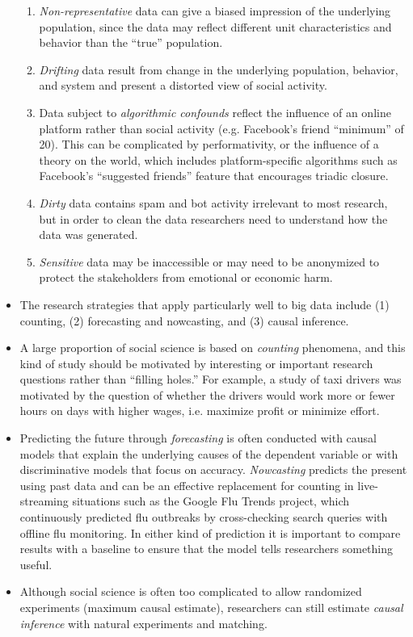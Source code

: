 \documentclass[11pt,letterpaper]{article}
\begin{document}
\begin{itemize}
\begin{enumerate}
\item \emph{Non-representative} data can give a biased impression of the underlying population, since the data may reflect different unit characteristics and behavior than the ``true'' population.
\item \emph{Drifting} data result from change in the underlying population, behavior, and system and present a distorted view of social activity.
\item Data subject to \emph{algorithmic confounds} reflect the influence of an online platform rather than social activity (e.g. Facebook's friend ``minimum'' of 20). This can be complicated by performativity, or the influence of a theory on the world, which includes platform-specific algorithms such as Facebook's ``suggested friends'' feature that encourages triadic closure. 
\item \emph{Dirty} data contains spam and bot activity irrelevant to most research, but in order to clean the data researchers need to understand how the data was generated.
\item \emph{Sensitive} data may be inaccessible or may need to be anonymized to protect the stakeholders from emotional or economic harm.
\end{enumerate}
\item The research strategies that apply particularly well to big data include (1) counting, (2) forecasting and nowcasting, and (3) causal inference.
\item A large proportion of social science is based on \emph{counting} phenomena, and this kind of study should be motivated by interesting or important research questions rather than ``filling holes.'' For example, a study of taxi drivers was motivated by the question of whether the drivers would work more or fewer hours on days with higher wages, i.e. maximize profit or minimize effort.
\item Predicting the future through \emph{forecasting} is often conducted with causal models that explain the underlying causes of the dependent variable or with discriminative models that focus on accuracy. \emph{Nowcasting} predicts the present using past data and can be an effective replacement for counting in live-streaming situations such as the Google Flu Trends project, which continuously predicted flu outbreaks by cross-checking search queries with offline flu monitoring. In either kind of prediction it is important to compare results with a baseline to ensure that the model tells researchers something useful.
\item Although social science is often too complicated to allow randomized experiments (maximum causal estimate), researchers can still estimate \emph{causal inference} with natural experiments and matching.

\end{itemize}
\end{document}
